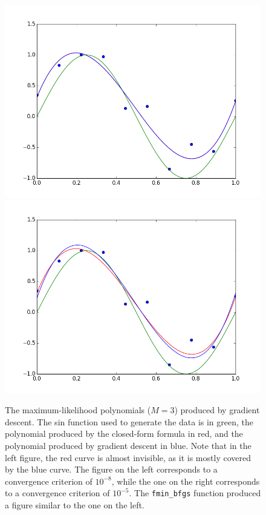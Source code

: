 \documentclass{article}
\begin{document}
\begin{figure}
\label{p2figure1}
\includegraphics[scale=0.4]{figure2_1.png}
\includegraphics[scale=0.4]{figure2_2.png}
\caption{The maximum-likelihood polynomials ($M=3$) produced by gradient descent. The sin function used to generate the data is in green, the polynomial produced by the closed-form formula in red, and the polynomial produced by gradient descent in blue. Note that in the left figure, the red curve is almost invisible, as it is mostly covered by the blue curve. The figure on the left corresponds to a convergence criterion of $10^{-8}$, while the one on the right corresponds to a convergence criterion of $10^{-5}$. The \texttt{fmin\_bfgs} function produced a figure similar to the one on the left.}
\end{figure}
\end{document}
